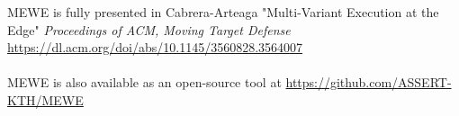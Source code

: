 



\begin{tcolorbox}[title=Contribution paper and artifact,boxrule=1pt,arc=.2em,boxsep=1.0mm]
  MEWE is fully presented in Cabrera-Arteaga \etal "Multi-Variant Execution at the Edge"
  \emph{Proceedings of ACM, Moving Target Defense}
 \url{https://dl.acm.org/doi/abs/10.1145/3560828.3564007}
 \\\\
 MEWE is also available as an open-source tool at \url{https://github.com/ASSERT-KTH/MEWE}
\end{tcolorbox}